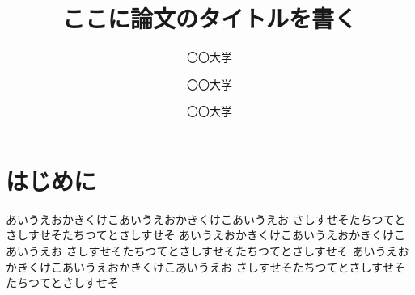 \documentclass[uplatex,9pt,twocolumn,dvipdfmx,a4j]{jsarticle}
\title{ここに論文のタイトルを書く}{English Title Here}
\author{〇〇大学}{○学生員}{〇〇 〇〇}{xxxx xxxx}
\author{〇〇大学}{正　員}{〇〇 〇〇}{xxxx xxxx}
\author{〇〇大学}{非会員}{〇〇 〇〇}{xxxx xxxx}
\begin{document}
\maketitle

\section{はじめに}
あいうえおかきくけこあいうえおかきくけこあいうえお
さしすせそたちつてとさしすせそたちつてとさしすせそ
あいうえおかきくけこあいうえおかきくけこあいうえお
さしすせそたちつてとさしすせそたちつてとさしすせそ
あいうえおかきくけこあいうえおかきくけこあいうえお
さしすせそたちつてとさしすせそたちつてとさしすせそ

\acknowledge


\end{document}
